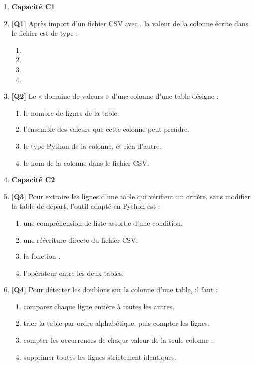\begin{enumerate}

\item[] \textbf{Capacité C1}

\item \textbf{[Q1]} Après import d'un fichier CSV avec , la valeur de la colonne  écrite  dans le fichier est de type :
  \begin{enumerate}[label=\Alph*.]
    \item {}
    \item {}
    \item {}
    \item {}
  \end{enumerate}

\item \textbf{[Q2]} Le « domaine de valeurs » d'une colonne d'une table désigne :
  \begin{enumerate}[label=\Alph*.]
    \item le nombre de lignes de la table.
    \item l'ensemble des valeurs que cette colonne peut prendre.
    \item le type Python de la colonne, et rien d'autre.
    \item le nom de la colonne dans le fichier CSV.
  \end{enumerate}

\item[] \textbf{Capacité C2}

\item \textbf{[Q3]} Pour extraire les lignes d'une table qui vérifient un critère, sans modifier la table de départ, l'outil adapté en Python est :
  \begin{enumerate}[label=\Alph*.]
    \item une compréhension de liste assortie d'une condition.
    \item une réécriture directe du fichier CSV.
    \item la fonction .
    \item l'opérateur \code{+} entre les deux tables.
  \end{enumerate}

\item \textbf{[Q4]} Pour détecter les doublons sur la colonne  d'une table, il faut :
  \begin{enumerate}[label=\Alph*.]
    \item comparer chaque ligne entière à toutes les autres.
    \item trier la table par ordre alphabétique, puis compter les lignes.
    \item compter les occurrences de chaque valeur de la seule colonne .
    \item supprimer toutes les lignes strictement identiques.
  \end{enumerate}


\end{enumerate}
